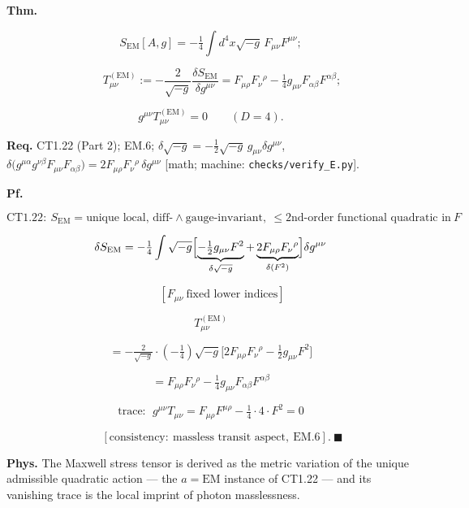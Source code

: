 \begin{theorem}\label{tag:EM-15}
\textbf{Thm.}

\[
S_{\mathrm{EM}}[A,g]=-\tfrac14\int d^4x\sqrt{-g}\,F_{\mu\nu}F^{\mu\nu};
\]

\[
\qquad T^{(\mathrm{EM})}_{\mu\nu}:=-\frac{2}{\sqrt{-g}}\frac{\delta S_{\mathrm{EM}}}{\delta g^{\mu\nu}}=F_{\mu\rho}F_\nu{}^{\rho}-\tfrac14g_{\mu\nu}F_{\alpha\beta}F^{\alpha\beta};
\]

\[
g^{\mu\nu}T^{(\mathrm{EM})}_{\mu\nu}=0\qquad(D=4).
\]

\textbf{Req.} CT1.22 (Part 2); EM.6; $\delta\sqrt{-g}=-\tfrac12\sqrt{-g}\,g_{\mu\nu}\delta g^{\mu\nu}$, $\delta\bigl(g^{\mu\alpha}g^{\nu\beta}F_{\mu\nu}F_{\alpha\beta}\bigr)=2F_{\mu\rho}F_\nu{}^\rho\,\delta g^{\mu\nu}$ [math; machine: \texttt{checks/\allowbreak{}verify\_\allowbreak{}E.py}].

\textbf{Pf.}

\[
\mathrm{CT1.22}:\ S_{\mathrm{EM}}=\text{unique local, diff-}\wedge\text{gauge-invariant},\ \le2\text{nd-order functional quadratic in}\ F
\]

\[
\delta S_{\mathrm{EM}}=-\tfrac14\int\sqrt{-g}\Bigl[\underbrace{-\tfrac12g_{\mu\nu}F^2}_{\delta\sqrt{-g}}+\underbrace{2F_{\mu\rho}F_\nu{}^{\rho}}_{\delta(F^2)}\Bigr]\delta g^{\mu\nu}
\]

\[
\qquad [F_{\mu\nu}\ \text{fixed lower indices}]
\]

\[
T^{(\mathrm{EM})}_{\mu\nu}
\]

\[
= -\tfrac{2}{\sqrt{-g}}\cdot(-\tfrac14)\sqrt{-g}\bigl[2F_{\mu\rho}F_\nu{}^{\rho}-\tfrac12g_{\mu\nu}F^2\bigr]
\]

\[
= F_{\mu\rho}F_\nu{}^{\rho}-\tfrac14g_{\mu\nu}F_{\alpha\beta}F^{\alpha\beta}
\]

\[
\text{trace}:\ \ g^{\mu\nu}T_{\mu\nu}=F_{\mu\rho}F^{\mu\rho}-\tfrac14\cdot4\cdot F^2=0
\]

\[
\qquad [\text{consistency}:\ \text{massless transit aspect},\ \mathrm{EM.6}].\ \blacksquare
\]

\textbf{Phys.} The Maxwell stress tensor is derived as the metric variation of the unique admissible quadratic action — the $a=\mathrm{EM}$ instance of CT1.22 — and its vanishing trace is the local imprint of photon masslessness.

\end{theorem}

